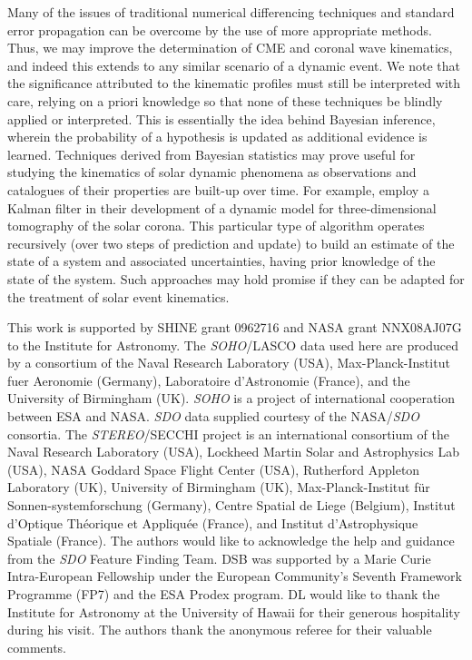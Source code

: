 \documentclass[structabstract]{aa}
\begin{document}
Many of the issues of traditional numerical differencing techniques and standard error propagation can be overcome by the use of more appropriate methods. Thus, we may improve the determination of CME and coronal wave kinematics, and indeed this extends to any similar scenario of a dynamic event. We note that the significance attributed to the kinematic profiles must still be interpreted with care, relying on a priori knowledge so that none of these techniques be blindly applied or interpreted. This is essentially the idea behind Bayesian inference, wherein the probability of a hypothesis is updated as additional evidence is learned. Techniques derived from Bayesian statistics may prove useful for studying the kinematics of solar dynamic phenomena as observations and catalogues of their properties are built-up over time. For example, \citet{2010SoPh..262..495B} employ a Kalman filter in their development of a dynamic model for three-dimensional tomography of the solar corona. This particular type of algorithm operates recursively (over two steps of prediction and update) to build an estimate of the state of a system and associated uncertainties, having prior knowledge of the state of the system. Such approaches may hold promise if they can be adapted for the treatment of solar event kinematics.


\begin{acknowledgements}
This work is supported by SHINE grant 0962716 and NASA grant NNX08AJ07G to the Institute for Astronomy. The \emph{SOHO}/LASCO data used here are produced by a consortium of the Naval Research Laboratory (USA), Max-Planck-Institut fuer Aeronomie (Germany), Laboratoire d'Astronomie (France), and the University of Birmingham (UK). \emph{SOHO} is a project of international cooperation between ESA and NASA. \emph{SDO} data supplied courtesy of the NASA/\emph{SDO} consortia. The \emph{STEREO}/SECCHI project is an international consortium of the Naval Research Laboratory (USA), Lockheed Martin Solar and Astrophysics Lab (USA), NASA Goddard Space Flight Center (USA), Rutherford Appleton Laboratory (UK), University of Birmingham (UK), Max-Planck-Institut f\"{u}r Sonnen-systemforschung (Germany), Centre Spatial de Liege (Belgium), Institut d'Optique Th\'{e}orique et Appliqu\'{e}e (France), and Institut d'Astrophysique Spatiale (France). The authors would like to acknowledge the help and guidance from the \emph{SDO} Feature Finding Team. DSB was supported by a Marie Curie Intra-European Fellowship under the European Community's Seventh Framework Programme (FP7) and the ESA Prodex program. DL would like to thank the Institute for Astronomy at the University of Hawaii for their generous hospitality during his visit. The authors thank the anonymous referee for their valuable comments.
\end{acknowledgements}




  
\end{document}
